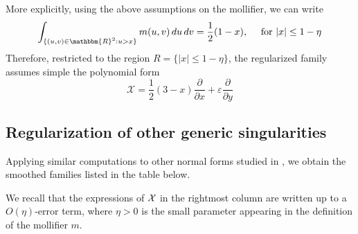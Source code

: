\documentclass[11pt,psamsfonts]{article}
\theoremstyle{definition}
\theoremstyle{remark}
\newcommand{\cR}{\ensuremath{\mathbbm{R}}}
\newcommand{\eps}{\varepsilon }
\begin{document}
More explicitly, using the above assumptions on the mollifier, we can write
$$
\int_{\{(u,v)\in \cR^2: u > x\}} m(u,v)\, du\, dv = \frac{1}{2}(1-x), \quad \text{ for $|x| \le 1-\eta$}
$$
Therefore, restricted to the region $R = \{|x| \le 1-\eta\}$, the regularized family assumes simple the polynomial form
$$
\mathcal{X} =  \frac{1}{2}(3-x) \frac{\partial}{\partial x} + \eps \frac{\partial}{\partial y}
$$
\subsection{Regularization of other generic singularities}
Applying similar computations to other normal forms studied in \cite{BPT}, we obtain the smoothed families listed in the table below. 

We recall that the expressions of $\cal X$ in the rightmost column are written up to a $O(\eta)$-error term, where $\eta>0$ is the small parameter appearing in the definition of the mollifier $m$. 
\end{document}
